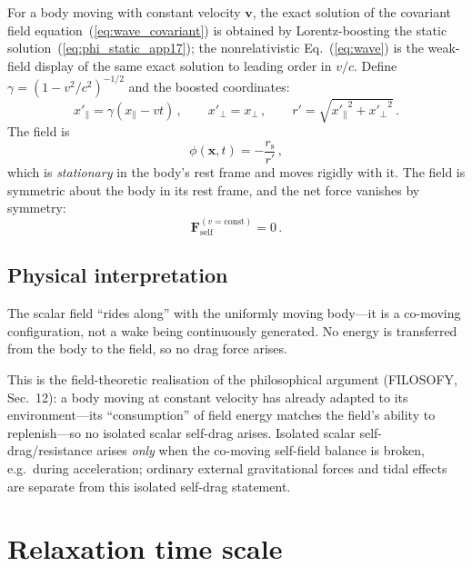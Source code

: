 \documentclass[11pt]{article}
\newcommand{\rs}{r_{\mathrm{s}}}
\begin{document}
For a body moving with constant velocity $\mathbf{v}$,
the exact solution of the covariant field
equation~(\ref{eq:wave_covariant}) is obtained by
Lorentz-boosting the static
solution~(\ref{eq:phi_static_app17}); the
nonrelativistic Eq.~(\ref{eq:wave}) is the weak-field
display of the same exact solution to leading order
in $v/c$.  Define
$\gamma = (1 - v^2/c^2)^{-1/2}$ and the boosted
coordinates:
\begin{equation}\label{eq:boost}
  x'_\parallel = \gamma(x_\parallel - vt)\,,\qquad
  x'_\perp = x_\perp\,,\qquad
  r' = \sqrt{{x'_\parallel}^2 + {x'_\perp}^2}\,.
\end{equation}
The field is
\begin{equation}\label{eq:phi_boosted}
  \phi(\mathbf{x},t) = -\frac{\rs}{r'}\,,
\end{equation}
which is \emph{stationary} in the body's rest frame
and moves rigidly with it.  The field is symmetric about
the body in its rest frame, and the net force vanishes
by symmetry:
\begin{equation}\label{eq:zero_force}
  \mathbf{F}_{\mathrm{self}}^{(v=\mathrm{const})} = 0\,.
\end{equation}

\subsection{Physical interpretation}

The scalar field ``rides along'' with the uniformly
moving body---it is a co-moving configuration, not a
wake being continuously generated.  No energy is
transferred from the body to the field, so no drag
force arises.

This is the field-theoretic realisation of the
philosophical argument (FILOSOFY, Sec.~12): a body
moving at constant velocity has already adapted to its
environment---its ``consumption'' of field energy
matches the field's ability to replenish---so no
isolated scalar self-drag arises.  Isolated scalar
self-drag/resistance arises \emph{only} when the
co-moving self-field balance is broken, e.g.\ during
acceleration; ordinary external gravitational forces
and tidal effects are separate from this isolated
self-drag statement.

\section{Relaxation time scale}\label{sec:relaxation}
\end{document}
